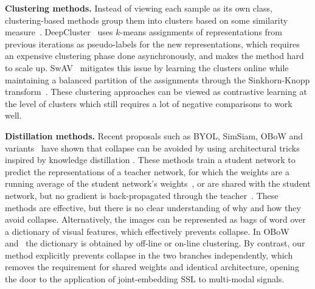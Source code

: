 \documentclass{article} %
\begin{document}
\vspace{2mm}
\textbf{Clustering methods.} Instead of viewing each sample as its own class, clustering-based methods group them into clusters based on some similarity measure~\cite{caron2020swav, caron2018clustering, bautista2016cliquecnn, yang2016joint, xie2016clustering, huang2019neighbourhood, zhuang2019local, caron2019noncurated, asano2020labelling, yan2020clusterfit}. DeepCluster~\cite{caron2018clustering} uses $k$-means assignments of representations from previous iterations as pseudo-labels for the new representations, which requires an expensive clustering phase done asynchronously, and makes the method hard to scale up. SwAV~\cite{caron2020swav} mitigates this issue by learning the clusters online while maintaining a balanced partition of the assignments through the Sinkhorn-Knopp transform~\cite{cuturi2013sinkhorn}. These clustering approaches can be viewed as contrastive learning at the level of clusters which still requires a lot of negative comparisons to work well. 

\vspace{2mm}
\noindent \textbf{Distillation methods.} Recent proposals such as BYOL, SimSiam, OBoW and variants~\cite{grill2020byol, chen2020simsiam, gidaris2021obow, richemond2020byolworks, gidaris2020bags} have shown that collapse can be avoided by using architectural tricks inspired by knowledge distillation \cite{hinton2015distillation}. These methods train a student network to predict the representations of a teacher network, for which the weights are a running average of the student network's weights~\cite{grill2020byol}, or are shared with the student network, but no gradient is back-propagated through the teacher~\cite{chen2020simsiam}. These methods are effective, but there is no clear understanding of why and how they avoid collapse. Alternatively, the images can be represented as bags of word over a dictionary of visual features, which effectively prevents collapse. In OBoW~\cite{gidaris2020bags} and~\cite{gidaris2021obow} the dictionary is obtained by off-line or on-line clustering. By contrast, our method explicitly prevents collapse in the two branches independently, which removes the requirement for shared weights and identical architecture, opening the door to the application of joint-embedding SSL to multi-modal signals.
\end{document}
